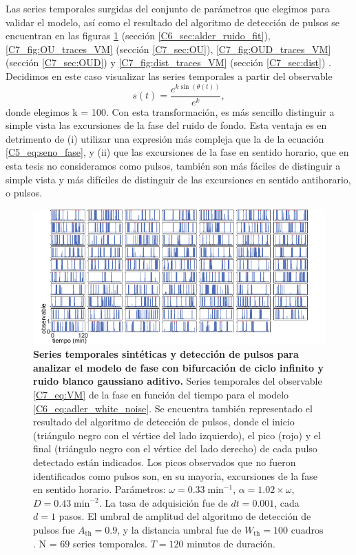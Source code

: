 \documentclass[./main.tex]{subfiles}
\begin{document}
\begin{subappendices}
Las series temporales surgidas del conjunto de parámetros que elegimos para validar el modelo, así como el resultado del algoritmo de detección de pulsos se encuentran en las figuras \ref{C6_ap_fig:traces_evaluation} (sección \ref{C6_sec:alder_ruido_fit}), \ref{C7_fig:OU_traces_VM} (sección \ref{C7_sec:OU}), \ref{C7_fig:OUD_traces_VM} (sección \ref{C7_sec:OUD}) y \ref{C7_fig:dist_traces_VM} (sección \ref{C7_sec:dist}) . Decidimos en este caso visualizar las series temporales a partir del observable 
\begin{equation}
    s(t) = \frac{e^{k\sin{(\theta(t))}}}{e^{k}},
    \label{C7_eq:VM}
\end{equation}
donde elegimos k = 100. Con esta transformación, es más sencillo distinguir a simple vista las excursiones de la fase del ruido de fondo. Esta ventaja es en detrimento de (i) utilizar una expresión más compleja que la de la ecuación \ref{C5_eq:seno_fase}, y (ii) que las excursiones de la fase en sentido horario, que en esta tesis no consideramos como pulsos, también son más fáciles de distinguir a simple vista y más difíciles de distinguir de las excursiones en sentido antihorario, o pulsos. 


\begin{figure}
    \centering
    \includegraphics[width=1\columnwidth]{figures/chapter6/C6_traces_for_evaluation_VM.pdf} 
    \caption{\textbf{Series temporales sintéticas y detección de pulsos para analizar el modelo de fase con bifurcación de ciclo infinito y ruido blanco gaussiano aditivo.} Series temporales del observable \ref{C7_eq:VM} de la fase en función del tiempo para el modelo \ref{C6_eq:adler_white_noise}. Se encuentra también representado el resultado del algoritmo de detección de pulsos, donde el inicio (triángulo negro con el vértice del lado izquierdo), el pico (rojo) y el final (triángulo negro con el vértice del lado derecho) de cada pulso detectado están indicados. Los picos observados que no fueron identificados como pulsos son, en su mayoría, excursiones de la fase en sentido horario. Parámetros:  $\omega = 0.33\;\text{min}^{-1}$, $\alpha = 1.02 \times \omega$, $ D = 0.43 \;\text{min}^{-2}$. La tasa de adquisición fue de $dt = 0.001$, cada $d = 1$ pasos. El umbral de amplitud del algoritmo de detección de pulsos fue $A_{\text{th}} = 0.9$, y la distancia umbral fue de $W_{\text{th}} = 100\text{ cuadros}$. N = $69$ series temporales. $T = 120$ minutos de duración.}
    \label{C6_ap_fig:traces_evaluation}
\end{figure}



\end{subappendices}
\end{document}
